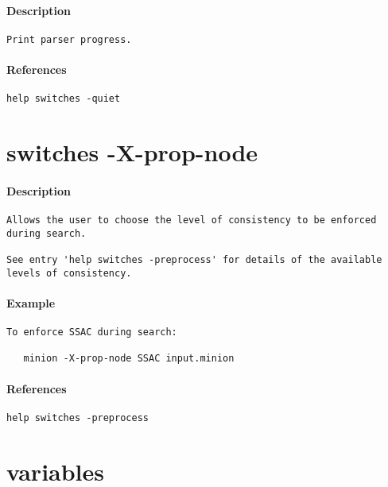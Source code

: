 \paragraph{Description}
{\footnotesize
\begin{verbatim}
Print parser progress.
\end{verbatim}
}
\paragraph{References}
{\footnotesize
\begin{verbatim}
help switches -quiet
\end{verbatim}
}
\section{switches -X-prop-node}
\paragraph{Description}
{\footnotesize
\begin{verbatim}
Allows the user to choose the level of consistency to be enforced
during search.

See entry 'help switches -preprocess' for details of the available
levels of consistency.
\end{verbatim}
}
\paragraph{Example}
{\footnotesize
\begin{verbatim}
To enforce SSAC during search:

   minion -X-prop-node SSAC input.minion
\end{verbatim}
}
\paragraph{References}
{\footnotesize
\begin{verbatim}
help switches -preprocess
\end{verbatim}
}
\section{variables}
